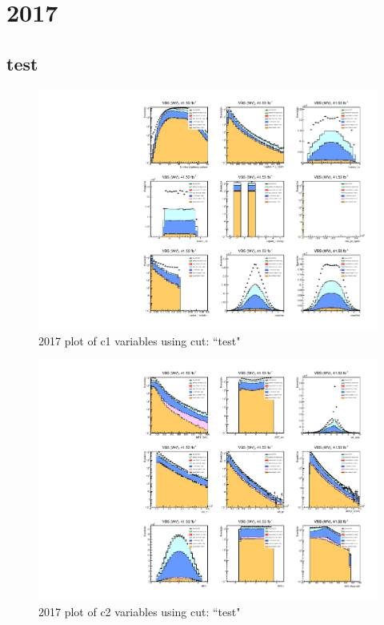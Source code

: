 \documentclass{article}
\begin{document}
    \section*{2017}
      \subsection*{test}
                        \begin{figure}[H]
                            \centering
                            \caption{2017 plot of c1 variables using cut: ``test"}
                            \includegraphics[width=\textwidth]{2017/c1_2017_test.pdf}
                        \end{figure}    
                        \begin{figure}[H]
                            \centering
                            \caption{2017 plot of c2 variables using cut: ``test"}
                            \includegraphics[width=\textwidth]{2017/c2_2017_test.pdf}
                        \end{figure}    
\end{document}

